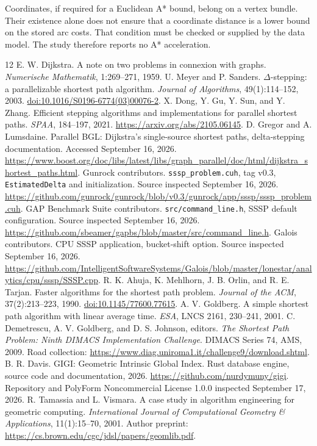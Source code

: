 \documentclass[11pt]{article}
\newcommand{\code}[1]{\texttt{#1}}
\begin{document}
\normalsize
Coordinates, if required for a Euclidean A* bound, belong on a vertex bundle.
Their existence alone does not ensure that a coordinate distance is a lower
bound on the stored arc costs. That condition must be checked or supplied by
the data model. The study therefore reports no A* acceleration.

\begin{thebibliography}{12}
 E. W. Dijkstra. A note on two problems in connexion with graphs.
\emph{Numerische Mathematik}, 1:269--271, 1959.
 U. Meyer and P. Sanders. $\Delta$-stepping: a parallelizable
shortest path algorithm. \emph{Journal of Algorithms}, 49(1):114--152, 2003.
\href{https://doi.org/10.1016/S0196-6774(03)00076-2}{doi:10.1016/S0196-6774(03)00076-2}.
 X. Dong, Y. Gu, Y. Sun, and Y. Zhang. Efficient stepping algorithms
and implementations for parallel shortest paths. \emph{SPAA}, 184--197, 2021.
\url{https://arxiv.org/abs/2105.06145}.
 D. Gregor and A. Lumsdaine. Parallel BGL: Dijkstra's single-source
shortest paths, delta-stepping documentation. Accessed September 16, 2026.
\url{https://www.boost.org/doc/libs/latest/libs/graph_parallel/doc/html/dijkstra_shortest_paths.html}.
 Gunrock contributors. \code{sssp\_problem.cuh}, tag v0.3,
\code{EstimatedDelta} and initialization. Source inspected September 16, 2026.
\url{https://github.com/gunrock/gunrock/blob/v0.3/gunrock/app/sssp/sssp_problem.cuh}.
 GAP Benchmark Suite contributors. \code{src/command\_line.h},
SSSP default configuration. Source inspected September 16, 2026.
\url{https://github.com/sbeamer/gapbs/blob/master/src/command_line.h}.
 Galois contributors. CPU SSSP application, bucket-shift option.
Source inspected September 16, 2026.
\url{https://github.com/IntelligentSoftwareSystems/Galois/blob/master/lonestar/analytics/cpu/sssp/SSSP.cpp}.
 R. K. Ahuja, K. Mehlhorn, J. B. Orlin, and R. E. Tarjan.
Faster algorithms for the shortest path problem. \emph{Journal of the ACM},
37(2):213--223, 1990. \href{https://doi.org/10.1145/77600.77615}{doi:10.1145/77600.77615}.
 A. V. Goldberg. A simple shortest path algorithm with linear
average time. \emph{ESA}, LNCS 2161, 230--241, 2001.
 C. Demetrescu, A. V. Goldberg, and D. S. Johnson, editors.
\emph{The Shortest Path Problem: Ninth DIMACS Implementation Challenge}.
DIMACS Series 74, AMS, 2009. Road collection:
\url{https://www.diag.uniroma1.it/challenge9/download.shtml}.
 B. R. Davis. GIGI: Geometric Intrinsic Global Index.
Rust database engine, source code and documentation, 2026.
\url{https://github.com/nurdymuny/gigi}.
Repository and PolyForm Noncommercial License 1.0.0 inspected September 17, 2026.
 R. Tamassia and L. Vismara.
A case study in algorithm engineering for geometric computing.
\emph{International Journal of Computational Geometry \& Applications},
11(1):15--70, 2001. Author preprint:
\url{https://cs.brown.edu/cgc/jdsl/papers/geomlib.pdf}.
\end{thebibliography}
\end{document}
